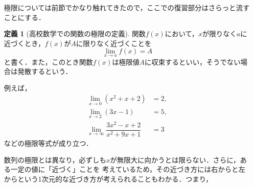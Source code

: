 \documentclass[a4paper,12pt,autodetect-engine,dvipdfmx]{jsarticle}
\theoremstyle{definition}
\newtheorem{dfn}{定義}[section]
\begin{document}
極限については前節でかなり触れてきたので，ここでの復習部分はさらっと流すことにする．
\begin{dfn}[高校数学での関数の極限の定義]
    関数$f(x)$において，$x$が限りなく$a$に近づくとき，$f(x)$が$A$に限りなく近づくことを
    $$\lim_{x \to a}f(x) = A$$
    と書く．また，このとき関数$f(x)$は極限値$A$に収束するといい，そうでない場合は発散するという．
\end{dfn}
例えば，
\begin{align*}
    \lim_{x \to 0}(x^2 + x + 2) &= 2,\\
    \lim_{x \to 2}(3x - 1) &= 5,\\
    \lim_{x \to \infty}\dfrac{3x^2 -x +2}{x^2 + 9x + 1} &= 3
\end{align*}
などの極限等式が成り立つ．

数列の極限とは異なり，必ずしも$x$が無限大に向かうとは限らない．さらに，ある一定の値に「近づく」ことを
考えているため，その近づき方には右からと左からという1次元的な近づき方が考えられることもわかる．つまり，







\end{document}

